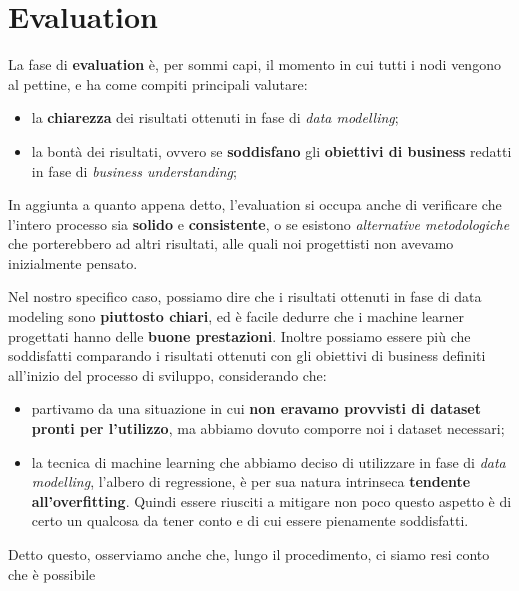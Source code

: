 \documentclass[a4paper, 11pt, oneside]{report}
\begin{document}
    \section{Evaluation}
            La fase di \textbf{evaluation} è, per sommi capi, il momento in cui tutti i nodi vengono al pettine,
            e ha come compiti principali valutare:
            \begin{itemize}
                \item la \textbf{chiarezza} dei risultati ottenuti in fase di \textit{data modelling};
                \item la bontà dei risultati, ovvero se \textbf{soddisfano} gli \textbf{obiettivi di business} redatti in
                fase di \textit{business understanding};
            \end{itemize}
            In aggiunta a quanto appena detto, l'evaluation si occupa anche di verificare che l'intero processo sia
            \textbf{solido} e \textbf{consistente}, o se esistono \textit{alternative metodologiche} che porterebbero ad altri risultati,
            alle quali noi progettisti non avevamo inizialmente pensato.
            \par \noindent Nel nostro specifico caso, possiamo dire che i risultati ottenuti in fase di data modeling sono
            \textbf{piuttosto chiari}, ed è facile dedurre che i machine learner progettati hanno delle \textbf{buone prestazioni}.
            Inoltre possiamo essere più che soddisfatti comparando i risultati ottenuti con gli obiettivi di business
            definiti all'inizio del processo di sviluppo, considerando che:
            \begin{itemize}
                \item partivamo da una situazione in cui \textbf{non eravamo provvisti di dataset pronti per l'utilizzo}, ma abbiamo
                dovuto comporre noi i dataset necessari;
                \item la tecnica di machine learning che abbiamo deciso di utilizzare in fase di \textit{data modelling},
                l'albero di regressione, è per sua natura intrinseca \textbf{tendente all'overfitting}.
                Quindi essere riusciti a mitigare non poco questo aspetto è di certo un qualcosa da tener conto e di cui essere
                pienamente soddisfatti.
            \end{itemize}
            \par \noindent Detto questo, osserviamo anche che, lungo il procedimento, ci siamo resi conto che è possibile
\end{document}
